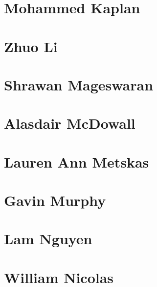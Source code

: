 \documentclass[]{tufte-book}
\begin{document}
\hypertarget{mohammed_kaplan}{%
\section*{Mohammed Kaplan}\label{mohammed_kaplan}}

\hypertarget{zhuo_li}{%
\section*{Zhuo Li}\label{zhuo_li}}

\hypertarget{shrawan_mageswaran}{%
\section*{Shrawan Mageswaran}\label{shrawan_mageswaran}}

\hypertarget{alasdair_mcdowall}{%
\section*{Alasdair McDowall}\label{alasdair_mcdowall}}

\hypertarget{lauren_ann_metskas}{%
\section*{Lauren Ann Metskas}\label{lauren_ann_metskas}}

\hypertarget{gavin_murphy}{%
\section*{Gavin Murphy}\label{gavin_murphy}}

\hypertarget{lam_nguyen}{%
\section*{Lam Nguyen}\label{lam_nguyen}}

\hypertarget{william_nicolas}{%
\section*{William Nicolas}\label{william_nicolas}}
\end{document}
